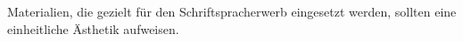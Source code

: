 Materialien, die gezielt für den Schriftspracherwerb eingesetzt werden, sollten eine einheitliche Ästhetik aufweisen.